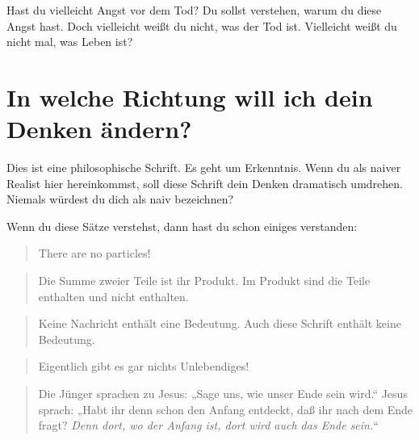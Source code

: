 \documentclass[12pt]{book}
\begin{document}
Hast du vielleicht Angst vor dem Tod? Du sollst verstehen, warum du diese Angst hast.
Doch vielleicht weißt du nicht, was der Tod ist. Vielleicht weißt du nicht mal, was Leben ist?

\section{In welche Richtung will ich dein Denken ändern?}

Dies ist eine philosophische Schrift. Es geht um Erkenntnis. Wenn du als naiver Realist hier hereinkommst, soll diese Schrift
dein Denken dramatisch umdrehen. Niemals würdest du dich als naiv bezeichnen?

Wenn du diese Sätze verstehst, dann hast du schon einiges verstanden:
\begin{quote}\begin{tcolorbox}
There are no particles!
\end{tcolorbox}\end{quote}
\begin{quote}\begin{tcolorbox}
Die Summe zweier Teile ist ihr Produkt. Im Produkt sind die Teile enthalten und nicht enthalten. 
\end{tcolorbox}\end{quote}
\begin{quote}\begin{tcolorbox}
Keine Nachricht enthält eine Bedeutung. Auch diese Schrift enthält keine Bedeutung.
\end{tcolorbox}\end{quote}
\begin{quote}\begin{tcolorbox}
Eigentlich gibt es gar nichts Unlebendiges!
\end{tcolorbox}\end{quote}
\begin{quote}\begin{tcolorbox}
Die Jünger sprachen zu Jesus: „Sage uns, wie unser Ende sein wird.“
Jesus sprach: „Habt ihr denn schon den Anfang entdeckt, daß ihr nach dem
Ende fragt? \emph{Denn dort, wo der Anfang ist, dort wird auch das Ende sein.}“
\end{tcolorbox}\end{quote}
\end{document}
